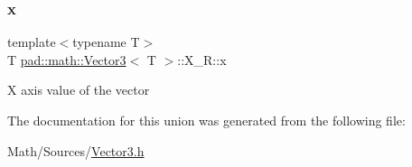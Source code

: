 \subsubsection{\texorpdfstring{x}{x}}
{\footnotesize\ttfamily template$<$typename T$>$ \\
T \mbox{\hyperlink{structpad_1_1math_1_1_vector3}{pad\+::math\+::\+Vector3}}$<$ T $>$\+::X\+\_\+\+R\+::x}

X axis value of the vector 

The documentation for this union was generated from the following file\+:\begin{DoxyCompactItemize}
\item 
Math/\+Sources/\mbox{\hyperlink{_vector3_8h}{Vector3.\+h}}\end{DoxyCompactItemize}
